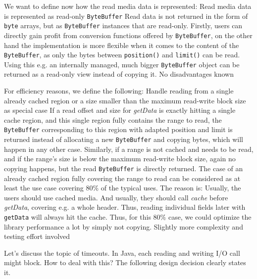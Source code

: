 We want to define now how the read media data is represented:
{%
Read media data is represented as read-only \texttt{ByteBuffer}
}
{%
Read data is not returned in the form of \texttt{byte} arrays, but as \texttt{ByteBuffer} instances that are read-only.
}
{%
Firstly, users can directly gain profit from conversion functions offered by \texttt{ByteBuffer}, on the other hand the implementation is more flexible when it comes to the content of the \texttt{ByteBuffer}, as only the bytes between \texttt{position()} and \texttt{limit()} can be read. Using this e.g. an internally managed, much bigger \texttt{ByteBuffer} object can be returned as a read-only view instead of copying it.
}
{%
No disadvantages known
}

For efficiency reasons, we define the following:
{%
Handle reading from a single already cached region or a size smaller than the maximum read-write block size as special case
}
{%
If a read offset and size for \emph{getData} is exactly hitting a single cache region, and this single region fully contains the range to read, the \texttt{ByteBuffer} corresponding to this region with adapted position and limit is returned instead of allocating a new \texttt{ByteBuffer} and copying bytes, which will happen in any other case. Similarly, if a range is not cached and needs to be read, and if the range's size is below the maximum read-write block size, again no copying happens, but the read \texttt{ByteBuffer} is directly returned.
}
{%
The case of an already cached region fully covering the range to read can be considered as at least the use case covering 80\% of the typical uses. The reason is: Usually, the users should use cached media. And usually, they should call \emph{cache} before \emph{getData}, covering e.g. a whole header. Thus, reading individual fields later with \texttt{getData} will always hit the cache. Thus, for this 80\% case, we could optimize the library performance a lot by simply not copying.
}
{%
Slightly more complexity and testing effort involved
}

Let's discuss the topic of timeouts. In Java, each reading and writing I/O call might block. How to deal with this? The following design decision clearly states it.

